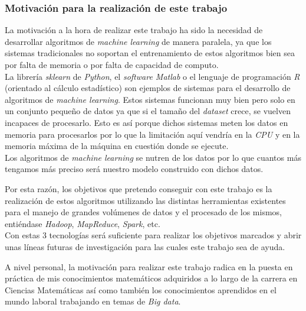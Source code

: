 \subsubsection*{Motivación para la realización de este trabajo}
La motivación a la hora de realizar este trabajo ha sido la necesidad de desarrollar algoritmos 
de \textit{machine learning} de manera paralela, ya que los sistemas tradicionales no soportan 
el entrenamiento de estos algoritmos bien sea por falta de memoria o por falta de capacidad de computo.\\
La librería \textit{sklearn} de \textit{Python}, el \textit{software Matlab} o el lenguaje de programación \textit{R}
(orientado al cálculo estadístico) son ejemplos de sistemas para el desarrollo de algoritmos de \textit{machine learning}.
Estos sistemas funcionan muy bien pero solo en un conjunto pequeño de datos ya que si el tamaño del \textit{dataset}
crece, se vuelven incapaces de procesarlo. Esto es así porque dichos sistemas meten los datos en memoria para
procesarlos por lo que la limitación aquí vendría en la \textit{CPU} y en la memoria máxima de la máquina en cuestión 
donde se ejecute.\\
Los algoritmos de \textit{machine learning} se nutren de los datos por lo que cuantos más tengamos más
preciso será nuestro modelo construido con dichos datos.

Por esta razón, los objetivos que pretendo conseguir con este trabajo es la realización de estos 
algoritmos utilizando las distintas herramientas existentes para el manejo de grandes volúmenes de 
datos y el procesado de los mismos, entiéndase \textit{Hadoop}, \textit{MapReduce}, \textit{Spark}, etc.\\
Con estas 3 tecnologías será suficiente para realizar los objetivos marcados y abrir unas líneas futuras 
de investigación para las cuales este trabajo sea de ayuda.
\newline

A nivel personal, la motivación para realizar este trabajo radica en la puesta en práctica de mis conocimientos
matemáticos adquiridos a lo largo de la carrera en Ciencias Matemáticas así como también los conocimientos
aprendidos en el mundo laboral trabajando en temas de \textit{Big data}.

\newpage

